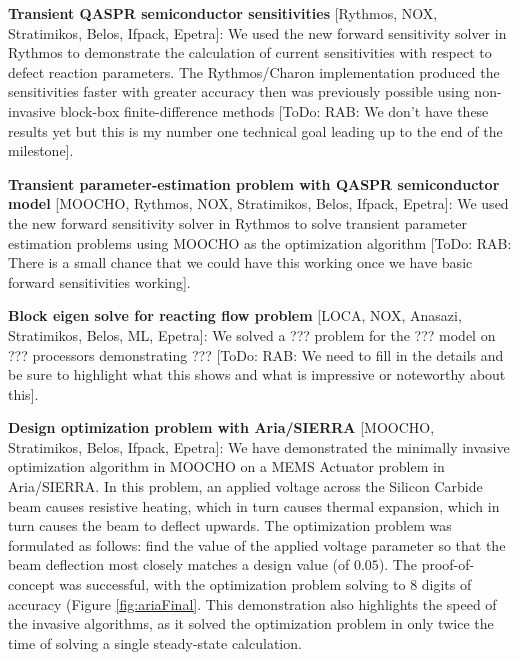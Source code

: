 \documentclass[pdf,ps2pdf,11pt]{SANDreport}
\begin{document}
{}\noindent\textbf{Transient QASPR semiconductor sensitivities} [Rythmos, NOX,
Stratimikos, Belos, Ifpack, Epetra]: We used the new forward sensitivity
solver in Rythmos to demonstrate the calculation of current sensitivities with
respect to defect reaction parameters.  The Rythmos/Charon implementation
produced the sensitivities faster with greater accuracy then was previously
possible using non-invasive block-box finite-difference methods [ToDo: RAB: We
don't have these results yet but this is my number one technical goal leading
up to the end of the milestone].
 
{}\noindent\textbf{Transient parameter-estimation problem with QASPR
semiconductor model} [MOOCHO, Rythmos, NOX, Stratimikos, Belos, Ifpack,
Epetra]: We used the new forward sensitivity solver in Rythmos to solve
transient parameter estimation problems using MOOCHO as the optimization
algorithm [ToDo: RAB: There is a small chance that we could have this working
once we have basic forward sensitivities working].

{}\noindent\textbf{Block eigen solve for reacting flow problem} [LOCA, NOX,
Anasazi, Stratimikos, Belos, ML, Epetra]: We solved a ??? problem for the ??? 
model on ??? processors demonstrating ??? [ToDo: RAB: We need to fill in the
details and be sure to highlight what this shows and what is impressive or
noteworthy about this].

{}\noindent\textbf{Design optimization problem with Aria/SIERRA} [MOOCHO,
Stratimikos, Belos, Ifpack, Epetra]: We have demonstrated the minimally
invasive optimization algorithm in MOOCHO on a MEMS Actuator problem in Aria/SIERRA.
In this problem, an applied voltage across the Silicon Carbide beam causes
resistive heating, which in turn causes thermal expansion, which in turn
causes the beam to deflect upwards. The optimization problem was formulated 
as follows: find the value of the applied voltage parameter so that the beam 
deflection most closely matches a design value (of $0.05$). The proof-of-concept
was successful, with the optimization problem 
solving to $8$ digits of accuracy (Figure {}\ref{fig:ariaFinal}. This demonstration
also highlights the speed of the invasive
algorithms, as it solved the optimization problem in only twice the
time of solving a single steady-state calculation.
\end{document}
